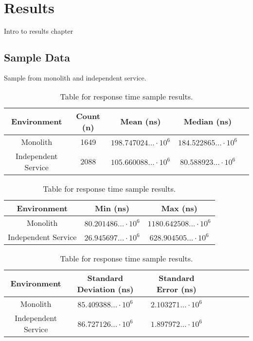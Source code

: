 \chapter{Results\label{results}}
Intro to results chapter

\section{Sample Data}
Sample from monolith and independent service.
\begin{table}[h!]
    \begin{tabular}{|c|c|c|c|c|} 
        \hline
        Environment
        & Count (n)
        & Mean (ns)
        & Median (ns) \\ [0.5ex] 
        
        \hline\hline
        Monolith
        & 1649
        & $198.747024... \cdot 10^6$
        & $184.522865... \cdot 10^6$\\ 
        
        Independent Service
        & 2088
        & $105.660088... \cdot 10^6$
        & $80.588923... \cdot 10^6$ \\
        \hline
    \end{tabular}
    \caption{Table for response time sample results.}
    \label{table:1}
\end{table}

\begin{table}[h!]
    \begin{tabular}{|c|c|c|} 
        \hline
        Environment
        & Min (ns)
        & Max (ns) \\ [0.5ex] 
        
        \hline\hline
        Monolith
        & $80.201486... \cdot 10^6$
        & $1180.642508... \cdot 10^6$ \\ 
        
        Independent Service
        & $26.945697... \cdot 10^6$
        & $628.904505... \cdot 10^6$ \\
        \hline
    \end{tabular}
    \caption{Table for response time sample results.}
    \label{table:1}
\end{table}

\begin{table}[h!]
    \begin{tabular}{|c|c|c|c|c|c|c|c|} 
        \hline
        Environment
        & Standard Deviation (ns)
        & Standard Error (ns) \\ [0.5ex] 
        
        \hline\hline
        Monolith
        & $85.409388... \cdot 10^6$
        & $2.103271... \cdot 10^6$ \\ 
        
        Independent Service
        & $86.727126... \cdot 10^6$
        & $1.897972... \cdot 10^6$ \\ 
         \hline
    \end{tabular}
    \caption{Table for response time sample results.}
    \label{table:1}
\end{table}

